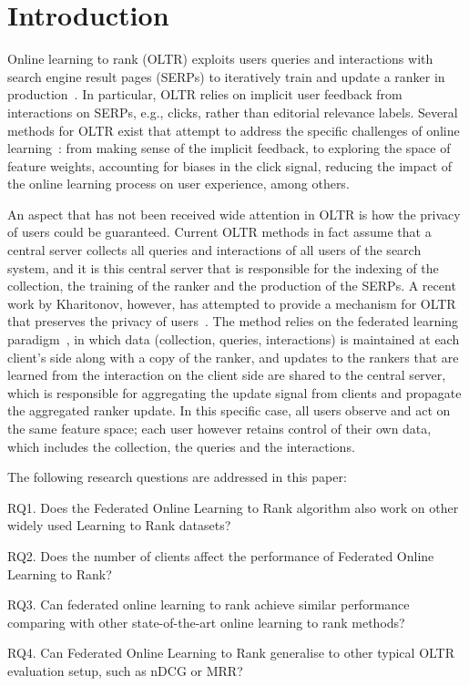 \section{Introduction}

Online learning to rank (OLTR) exploits users queries and interactions with search engine result pages (SERPs) to iteratively train and update a ranker in  production~\cite{bibid}. In particular, OLTR relies on implicit user feedback from interactions on SERPs, e.g., clicks, rather than editorial relevance labels. 
Several methods for OLTR exist that attempt to address the specific challenges of online learning~\cite{bibid}: from making sense of the implicit feedback, to exploring the space of feature weights, accounting for biases in the click signal, reducing the impact of the online learning process on user experience, among others. 

An aspect that has not been received wide attention in OLTR is how the privacy of users could be guaranteed. Current OLTR methods in fact assume that a central server collects all queries and interactions of all users of the search system, and it is this central server that is responsible for the indexing of the collection, the training of the ranker and the production of the SERPs. A recent work by Kharitonov, however, has attempted to provide a mechanism for OLTR that preserves the privacy of users~\cite{kharitonov2019federated}. The method relies on the federated learning paradigm~\cite{bibid}, in which data (collection, queries, interactions) is maintained at each client's side along with a copy of the ranker, and updates to the rankers that are learned from the interaction on the client side are shared to the central server, which is responsible for aggregating the update signal from clients and propagate the aggregated ranker update. In this specific case, all users observe and act on the same feature space; each user however retains control of their own data, which includes the collection, the queries and the interactions.  





The following research questions are addressed in this paper:

RQ1. Does the Federated Online Learning to Rank algorithm also work on other widely used Learning to Rank datasets?

RQ2. Does the number of clients affect the performance of Federated Online Learning to Rank?

RQ3. Can federated online learning to rank achieve similar performance comparing with other state-of-the-art online learning to rank methods?

RQ4. Can Federated Online Learning to Rank generalise to other typical OLTR evaluation setup, such as nDCG or MRR?


